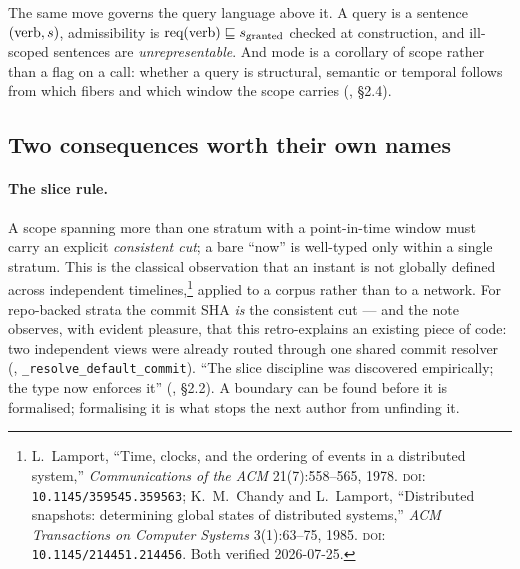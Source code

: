 The same move governs the query language above it. A query is a sentence
$(\text{verb}, s{})$, admissibility is
$\text{req}(\text{verb}) \sqsubseteq{} s{}_{\text{granted}}$ checked at
construction, and ill-scoped sentences are \emph{unrepresentable}. And mode is a
corollary of scope rather than a flag on a call: whether a query is structural,
semantic or temporal follows from which fibers and which window the scope carries
(, \S 2.4).

\subsection*{Two consequences worth their own names}

\paragraph{The slice rule.} A scope spanning more than one stratum with a
point-in-time window must carry an explicit \emph{consistent cut}; a bare ``now'' is
well-typed only within a single stratum. This is the classical observation that an
instant is not globally defined across independent
timelines,\footnote{L.~Lamport, ``Time, clocks, and the ordering of events in a
distributed system,'' \emph{Communications of the ACM} 21(7):558--565, 1978.
\textsc{doi}:\,\texttt{10.1145/359545.359563}; K.~M.~Chandy and L.~Lamport,
``Distributed snapshots: determining global states of distributed systems,''
\emph{ACM Transactions on Computer Systems} 3(1):63--75, 1985.
\textsc{doi}:\,\texttt{10.1145/214451.214456}. Both verified 2026-07-25.} applied
to a corpus rather than to a network. For repo-backed strata the commit SHA
\emph{is} the consistent cut --- and the note observes, with evident pleasure, that
this retro-explains an existing piece of code: two independent views were already
routed through one shared commit resolver
(, \texttt{\_resolve\_default\_commit}).
``The slice discipline was discovered empirically; the type now enforces it''
(, \S 2.2). A boundary can be found before it is
formalised; formalising it is what stops the next author from unfinding it.

